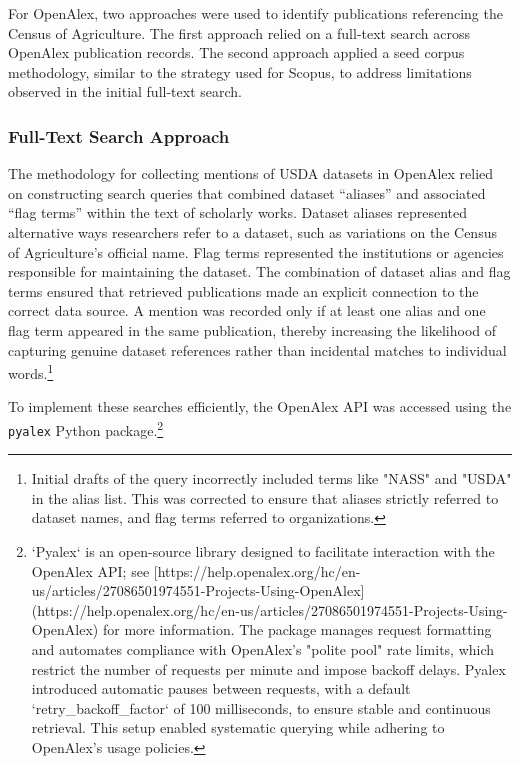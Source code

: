 \documentclass[
  letterpaper,
  DIV=11,
  numbers=noendperiod]{scrartcl}
\begin{document}
For OpenAlex, two approaches were used to identify publications
referencing the Census of Agriculture. The first approach relied on a
full-text search across OpenAlex publication records. The second
approach applied a seed corpus methodology, similar to the strategy used
for Scopus, to address limitations observed in the initial full-text
search.

\subsubsection{Full-Text Search
Approach}\label{full-text-search-approach}

The methodology for collecting mentions of USDA datasets in OpenAlex
relied on constructing search queries that combined dataset ``aliases''
and associated ``flag terms'' within the text of scholarly works.
Dataset aliases represented alternative ways researchers refer to a
dataset, such as variations on the Census of Agriculture's official
name. Flag terms represented the institutions or agencies responsible
for maintaining the dataset. The combination of dataset alias and flag
terms ensured that retrieved publications made an explicit connection to
the correct data source. A mention was recorded only if at least one
alias and one flag term appeared in the same publication, thereby
increasing the likelihood of capturing genuine dataset references rather
than incidental matches to individual
words.\footnote{Initial drafts of the query incorrectly included terms like "NASS" and "USDA" in the alias list. This was corrected to ensure that aliases strictly referred to dataset names, and flag terms referred to organizations.}

To implement these searches efficiently, the OpenAlex API was accessed
using the \texttt{pyalex} Python
package.\footnote{`Pyalex` is an open-source library designed to facilitate interaction with the OpenAlex API; see [https://help.openalex.org/hc/en-us/articles/27086501974551-Projects-Using-OpenAlex](https://help.openalex.org/hc/en-us/articles/27086501974551-Projects-Using-OpenAlex) for more information. The package manages request formatting and automates compliance with OpenAlex's "polite pool" rate limits, which restrict the number of requests per minute and impose backoff delays. Pyalex introduced automatic pauses between requests, with a default `retry_backoff_factor` of 100 milliseconds, to ensure stable and continuous retrieval. This setup enabled systematic querying while adhering to OpenAlex's usage policies.}
\end{document}
